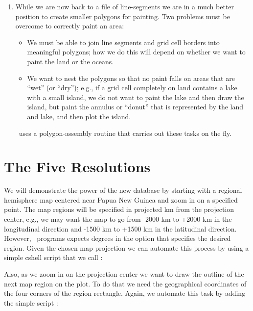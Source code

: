 \begin{enumerate}
\item While we are now back to a file of line-segments we are in
a much better position to create smaller polygons for painting.
Two problems must be overcome to correctly paint an area:

\begin{itemize}

\item We must be able to join line segments and grid cell borders
into meaningful polygons; how we do this will depend on whether
we want to paint the land or the oceans.

\item We want to nest the polygons so that no paint falls on areas
that are ``wet'' (or ``dry''); e.g., if a grid cell completely on
land contains a lake with a small island, we do not want to paint
the lake and then draw the island, but paint the annulus or ``donut''
that is represented by the land and lake, and then plot the island.

\end{itemize}

\GMT\ uses a polygon-assembly routine that carries out these
tasks on the fly.

\end{enumerate} 

\section{The Five Resolutions} 

We will demonstrate the power of the new database by starting with
a regional hemisphere map centered near Papua New Guinea and zoom
in on a specified point.  The map regions will be specified in
projected km from the projection center, e.g., we may want the
map to go from \mbox{-2000} km to \mbox{+2000} km in the longitudinal direction
and \mbox{-1500} km to +1500 km in the latitudinal direction.
However, \GMT\ programs expects degrees in the  option that
specifies the desired region.  Given the chosen map projection we
can automate this process by using a simple cshell script that we
call :

 

Also, as we zoom in on the projection center we want to draw the
outline of the next map region on the plot.  To do that we need
the geographical coordinates of the four corners of the region
rectangle.  Again, we automate this task by adding the simple
script :

